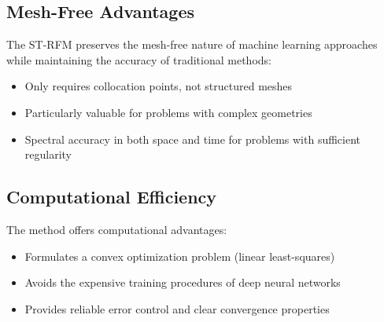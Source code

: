 \documentclass[11pt]{article}
\begin{document}
\subsection{Mesh-Free Advantages}

The ST-RFM preserves the mesh-free nature of machine learning approaches while maintaining the accuracy of traditional methods:
\begin{itemize}
    \item Only requires collocation points, not structured meshes
    \item Particularly valuable for problems with complex geometries
    \item Spectral accuracy in both space and time for problems with sufficient regularity
\end{itemize}

\subsection{Computational Efficiency}

The method offers computational advantages:
\begin{itemize}
    \item Formulates a convex optimization problem (linear least-squares)
    \item Avoids the expensive training procedures of deep neural networks
    \item Provides reliable error control and clear convergence properties
\end{itemize}
\end{document}
